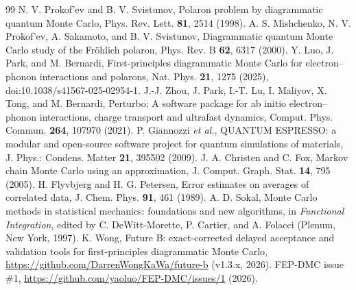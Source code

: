 \documentclass[aps,prb,reprint,superscriptaddress,nofootinbib]{revtex4-2}
\begin{document}
\begin{thebibliography}{99}
 N. V. Prokof'ev and B. V. Svistunov, Polaron problem by diagrammatic quantum Monte Carlo, Phys. Rev. Lett. \textbf{81}, 2514 (1998).
 A. S. Mishchenko, N. V. Prokof'ev, A. Sakamoto, and B. V. Svistunov, Diagrammatic quantum Monte Carlo study of the Fr\"ohlich polaron, Phys. Rev. B \textbf{62}, 6317 (2000).
 Y. Luo, J. Park, and M. Bernardi, First-principles diagrammatic Monte Carlo for electron--phonon interactions and polarons, Nat. Phys. \textbf{21}, 1275 (2025), doi:10.1038/s41567-025-02954-1.
 J.-J. Zhou, J. Park, I.-T. Lu, I. Maliyov, X. Tong, and M. Bernardi, Perturbo: A software package for ab initio electron--phonon interactions, charge transport and ultrafast dynamics, Comput. Phys. Commun. \textbf{264}, 107970 (2021).
 P. Giannozzi \emph{et al.}, QUANTUM ESPRESSO: a modular and open-source software project for quantum simulations of materials, J. Phys.: Condens. Matter \textbf{21}, 395502 (2009).
 J. A. Christen and C. Fox, Markov chain Monte Carlo using an approximation, J. Comput. Graph. Stat. \textbf{14}, 795 (2005).
 H. Flyvbjerg and H. G. Petersen, Error estimates on averages of correlated data, J. Chem. Phys. \textbf{91}, 461 (1989).
 A. D. Sokal, Monte Carlo methods in statistical mechanics: foundations and new algorithms, in \emph{Functional Integration}, edited by C. DeWitt-Morette, P. Cartier, and A. Folacci (Plenum, New York, 1997).
 K. Wong, Future B: exact-corrected delayed acceptance and validation tools for first-principles diagrammatic Monte Carlo, \url{https://github.com/DarrenWongKaWa/future-b} (v1.3.x, 2026).
 FEP-DMC issue \#1, \url{https://github.com/yaoluo/FEP-DMC/issues/1} (2026).
\end{thebibliography}
\end{document}
